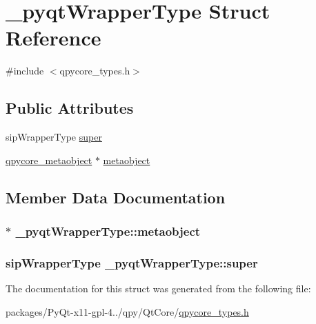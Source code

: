 \hypertarget{struct__pyqtWrapperType}{}\section{\+\_\+pyqt\+Wrapper\+Type Struct Reference}
\label{struct__pyqtWrapperType}


{\ttfamily \#include $<$qpycore\+\_\+types.\+h$>$}

\subsection*{Public Attributes}
\begin{DoxyCompactItemize}
\item 
sip\+Wrapper\+Type \hyperlink{struct__pyqtWrapperType_a648f11f735848482f75d5e5c6245dcd7}{super}
\item 
\hyperlink{structqpycore__metaobject}{qpycore\+\_\+metaobject} $\ast$ \hyperlink{struct__pyqtWrapperType_ac1080c81b224ab05b3fe34e3fb96a897}{metaobject}
\end{DoxyCompactItemize}


\subsection{Member Data Documentation}
\hypertarget{struct__pyqtWrapperType_ac1080c81b224ab05b3fe34e3fb96a897}{}
\subsubsection[{metaobject}]{$\ast$ \+\_\+pyqt\+Wrapper\+Type\+::metaobject}\label{struct__pyqtWrapperType_ac1080c81b224ab05b3fe34e3fb96a897}
\hypertarget{struct__pyqtWrapperType_a648f11f735848482f75d5e5c6245dcd7}{}
\subsubsection[{super}]{\setlength{\rightskip}{0pt plus 5cm}sip\+Wrapper\+Type \+\_\+pyqt\+Wrapper\+Type\+::super}\label{struct__pyqtWrapperType_a648f11f735848482f75d5e5c6245dcd7}


The documentation for this struct was generated from the following file\+:\begin{DoxyCompactItemize}
\item 
packages/\+Py\+Qt-\/x11-\/gpl-\/4../qpy/\+Qt\+Core/\hyperlink{qpycore__types_8h}{qpycore\+\_\+types.\+h}\end{DoxyCompactItemize}
